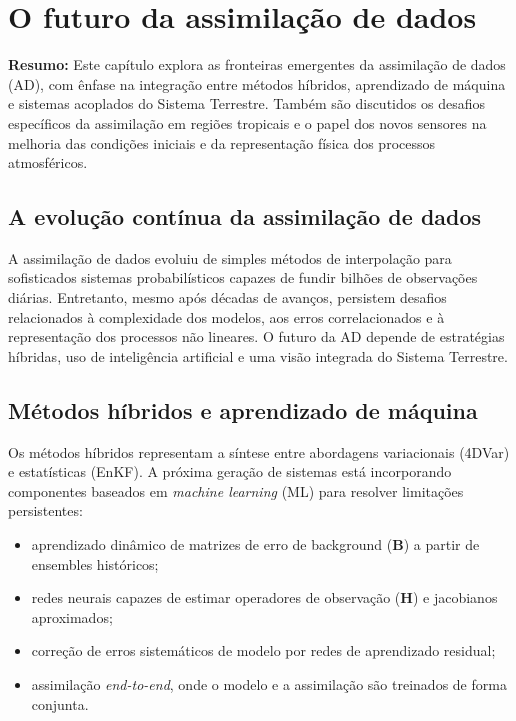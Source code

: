 \chapter{O futuro da assimilação de dados}
\label{ch:futuro}

\noindent\textbf{Resumo:}
Este capítulo explora as fronteiras emergentes da assimilação de dados (AD), com ênfase na integração entre métodos híbridos, aprendizado de máquina e sistemas acoplados do Sistema Terrestre.
Também são discutidos os desafios específicos da assimilação em regiões tropicais e o papel dos novos sensores na melhoria das condições iniciais e da representação física dos processos atmosféricos.

\section{A evolução contínua da assimilação de dados}
A assimilação de dados evoluiu de simples métodos de interpolação para sofisticados sistemas probabilísticos capazes de fundir bilhões de observações diárias.
Entretanto, mesmo após décadas de avanços, persistem desafios relacionados à complexidade dos modelos, aos erros correlacionados e à representação dos processos não lineares.
O futuro da AD depende de estratégias híbridas, uso de inteligência artificial e uma visão integrada do Sistema Terrestre.

\section{Métodos híbridos e aprendizado de máquina}
Os métodos híbridos representam a síntese entre abordagens variacionais (4DVar) e estatísticas (EnKF).
A próxima geração de sistemas está incorporando componentes baseados em \emph{machine learning} (ML) para resolver limitações persistentes:
\begin{itemize}
  \item aprendizado dinâmico de matrizes de erro de background ($\mathbf{B}$) a partir de ensembles históricos;
  \item redes neurais capazes de estimar operadores de observação ($\mathbf{H}$) e jacobianos aproximados;
  \item correção de erros sistemáticos de modelo por redes de aprendizado residual;
  \item assimilação \emph{end-to-end}, onde o modelo e a assimilação são treinados de forma conjunta.
\end{itemize}

